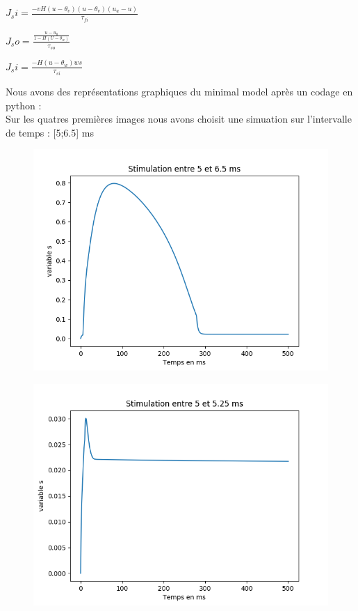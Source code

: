 \documentclass[a4paper,12pt,twoside]{report}
\begin{document}
$J_si=\frac{-vH(u-\theta_v)(u-\theta_v)(u_u-u)}{\tau_{fi}}$

$J_so=\frac{\frac{u-u_0}{1-H(U-\theta_w)}}{\tau_{so}}$

$J_si=\frac{-H(u-\theta_w)ws}{\tau_{si}}$



Nous avons des représentations graphiques du minimal model après un codage en python :\\

Sur les quatres premières images nous avons choisit une simuation sur l'intervalle de temps : [5;6.5] ms\\

\begin{figure}
	\centering
	\includegraphics[scale=0.5]{./s(t).png}
\end{figure}

\begin{figure}
	\centering
	\includegraphics[scale=0.5]{./s(t)_2.png}
\end{figure}
\end{document}
